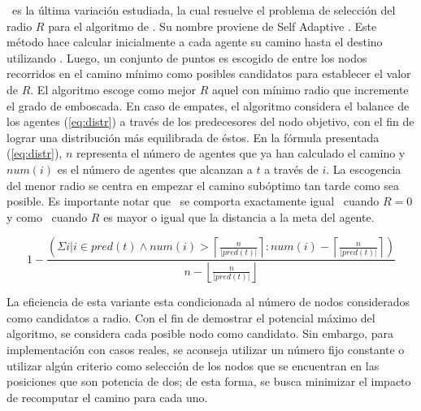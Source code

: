 \sarambush\ es la \'ultima variaci\'on estudiada, la cual
resuelve el problema de selecci\'on del radio $R$ para el
algoritmo de \rambush. Su nombre proviene de Self Adaptive
\rambush. Este m\'etodo hace calcular inicialmente a cada
agente su camino hasta el destino utilizando \astar. Luego,
un conjunto de puntos es escogido de entre los nodos recorridos
en el camino m\'inimo como posibles candidatos para establecer
el valor de $R$. El algoritmo escoge como mejor $R$ aquel
con m\'inimo radio que incremente el grado de emboscada. En
caso de empates, el algoritmo considera el balance de los
agentes (\ref{eq:distr}) a trav\'es de los predecesores del
nodo objetivo, con el fin de lograr una distribuci\'on m\'as
equilibrada de \'estos. 
En la f\'ormula presentada (\ref{eq:distr}), $n$ representa
el n\'umero de agentes que ya han calculado el camino y
$num(i)$ es el n\'umero de agentes que alcanzan a $t$ a trav\'es
de $i$.
La escogencia del menor radio se
centra en empezar el camino sub\'optimo tan tarde como sea
posible. Es importante notar que \rambush\ se comporta exactamente
igual \astar\ cuando $R=0$ y como \ambush\ cuando $R$ es mayor
o igual que la distancia a la meta del agente.

\begin{small}
\begin{equation}
1-\dfrac{\left(\Sigma i |  i \in pred(t)
  						\wedge num(i) > 
  							\left\lceil \frac{n}{|pred(t)|} \right\rceil 
  					:  num(i) - 
  						\left\lceil \frac{n}{|pred(t)|} \right\rceil\right)}
  						{n-\left\lfloor \frac{n}{|pred(t)|} \right\rfloor}
\label{eq:distr}
\end{equation}
\end{small}

La eficiencia de esta variante esta condicionada al n\'umero de
nodos considerados como candidatos a radio. Con el fin de demostrar
el potencial m\'aximo del algoritmo, se con\-si\-de\-ra cada posible nodo
como candidato. Sin embargo, para implementaci\'on con casos reales, 
se aconseja utilizar un n\'umero fijo constante o utilizar alg\'un
criterio como selecci\'on de los nodos que se encuentran en las
posiciones que son potencia de dos; de esta forma, se busca minimizar
el impacto de recomputar el camino para cada uno.
